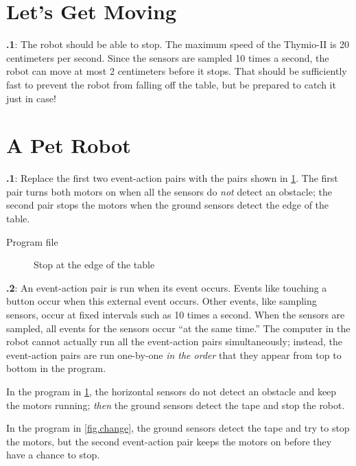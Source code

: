 \documentclass[12pt,a4paper,english]{article}
\begin{document}
\section{Let's Get Moving}

\textbf{\thesection.1}: The robot should be able to stop. The
maximum speed of the Thymio-II is 20 centimeters per second. Since the
sensors are sampled 10 times a second, the robot can move at most 2
centimeters before it stops. That should be sufficiently fast to prevent
the robot from falling off the table, but be prepared to catch it just
in case!


\section{A Pet Robot}

\textbf{\thesection.1}: Replace the first two event-action pairs
with the pairs shown in \cref{fig.answer1}. The first pair turns
both motors on when all the sensors do \emph{not} detect an obstacle;
the second pair stops the motors when the ground sensors detect the edge
of the table.

{\raggedleft \hfill Program file }

\begin{figure}[hbt]
\begin{center}
\caption{Stop at the edge of the table}\label{fig.answer1}
\end{center}
\end{figure}

\textbf{\thesection.2}: An event-action pair is run when its event
occurs. Events like touching a button occur when this external event
occurs. Other events, like sampling sensors, occur at fixed intervals
such as 10 times a second. When the sensors are sampled, all events for
the sensors occur ``at the same time.'' The computer in the robot cannot
actually run all the event-action pairs simultaneously; instead, the
event-action pairs are run one-by-one \emph{in the order} that they
appear from top to bottom in the program.

In the program in \cref{fig.answer1}, the horizontal sensors
do not detect an obstacle and keep the motors running; \emph{then} the
ground sensors detect the tape and stop the robot.

In the program in \cref{fig.change}, the ground sensors
detect the tape and try to stop the motors, but the second event-action
pair keeps the motors on before they have a chance to stop.
\end{document}
